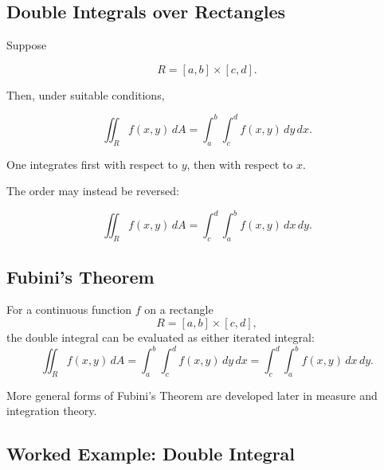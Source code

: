 \subsection{Double Integrals over Rectangles}
\label{subsec:double-integrals-rectangles}

Suppose

\[ R=[a,b]\times[c,d]. \]

Then, under suitable conditions,

\[ \iint_R f(x,y)\,dA
=
\int_a^b\int_c^d f(x,y)\,dy\,dx. \]

One integrates first with respect to \(y\), then with respect to \(x\).

The order may instead be reversed:

\[ \iint_R f(x,y)\,dA
=
\int_c^d\int_a^b f(x,y)\,dx\,dy. \]

\subsection{Fubini's Theorem}
\label{subsec:fubini-calculus}

\begin{theorem}
For a continuous function \(f\) on a rectangle
\[ R=[a,b]\times[c,d], \]
the double integral can be evaluated as either iterated integral:
\[ \iint_R f(x,y)\,dA
=
\int_a^b\int_c^d f(x,y)\,dy\,dx
=
\int_c^d\int_a^b f(x,y)\,dx\,dy. \]
\end{theorem}

More general forms of Fubini's Theorem are developed later in measure and
integration theory.

\subsection{Worked Example: Double Integral}
\label{subsec:worked-double-integral}

